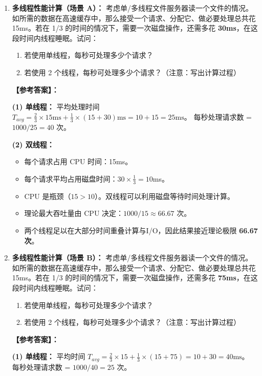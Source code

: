 \documentclass[a4paper,12pt]{article}
\newcommand{\answer}[1]{\par\vspace{0.5em}\hspace{2em}\textbf{【参考答案】：}\\{\color{blue}#1}\par\vspace{1em}}
\begin{document}
\begin{enumerate}[label=\arabic*.]
    \item \textbf{多线程性能计算（场景 A）：}
    考虑单/多线程文件服务器读一个文件的情况。如所需的数据在高速缓存中，那么接受一个请求、分配它、做必要处理总共花 15ms。若在 1/3 的时间的情况下，需要一次磁盘操作，还需多花 \textbf{30ms}，在这段时间内线程睡眠。试问：
    \begin{enumerate}[label=(\arabic*)]
        \item 若使用单线程，每秒可处理多少个请求？
        \item 若使用 2 个线程，每秒可处理多少个请求？（注意：写出计算过程）
    \end{enumerate}

    \answer{
    \textbf{(1) 单线程：}
    平均处理时间 $T_{avg} = \frac{2}{3} \times 15\text{ms} + \frac{1}{3} \times (15 + 30)\text{ms} = 10 + 15 = 25\text{ms}$。
    每秒处理请求数 = $1000 / 25 = 40$ 次。
    
    \textbf{(2) 双线程：}
    \begin{itemize}
        \item 每个请求占用 CPU 时间：15ms。
        \item 每个请求平均占用磁盘时间：$30 \times \frac{1}{3} = 10$ms。
        \item CPU 是瓶颈（$15 > 10$）。双线程可以利用磁盘等待时间处理计算。
        \item 理论最大吞吐量由 CPU 决定：$1000 / 15 \approx 66.67$ 次。
        \item 两个线程足以在大部分时间重叠计算与I/O，因此结果接近理论极限 \textbf{66.67 次}。
    \end{itemize}
    }

    \item \textbf{多线程性能计算（场景 B）：}
    考虑单/多线程文件服务器读一个文件的情况。如所需的数据在高速缓存中，那么接受一个请求、分配它、做必要处理总共花 15ms。若在 1/3 的时间的情况下，需要一次磁盘操作，还需多花 \textbf{75ms}，在这段时间内线程睡眠。试问：
    \begin{enumerate}[label=(\arabic*)]
        \item 若使用单线程，每秒可处理多少个请求？
        \item 若使用 2 个线程，每秒可处理多少个请求？（注意：写出计算过程）
    \end{enumerate}

    \answer{
    \textbf{(1) 单线程：}
    平均时间 $T_{avg} = \frac{2}{3} \times 15 + \frac{1}{3} \times (15 + 75) = 10 + 30 = 40\text{ms}$。
    每秒处理请求数 = $1000 / 40 = 25$ 次。
    
}
\end{enumerate}
\end{document}
